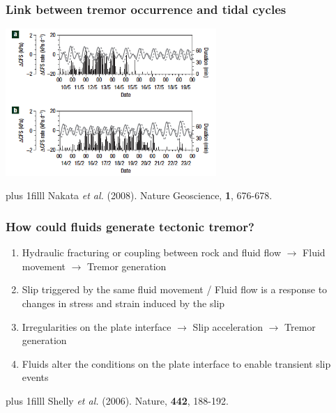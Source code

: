 \documentclass{beamer}
\newcommand{\btVFill}{\vskip0pt plus 1filll}
\begin{document}
	\begin{frame}
		\frametitle{Link between tremor occurrence and tidal cycles}
		\begin{center}
			\includegraphics[trim={0cm 0cm 0cm 0cm}, clip, width=8cm]{articles/nakata_al_2008_2.png}
		\end{center}
		\btVFill
		\tiny{Nakata \textit{et al.} (2008). Nature Geoscience, \textbf{1}, 676-678.}
	\end{frame}

	\begin{frame}
		\frametitle{How could fluids generate tectonic tremor?}
		\vspace{1em}

		\begin{enumerate}
			\item Hydraulic fracturing or coupling between rock and fluid flow $\rightarrow$ Fluid movement $\rightarrow$ Tremor generation
			\item[] Slip triggered by the same fluid movement / Fluid flow is a response to changes in stress and strain induced by the slip

			\vspace{2em}

			\item Irregularities on the plate interface $\rightarrow$ Slip acceleration $\rightarrow$ Tremor generation
			\item[] Fluids alter the conditions on the plate interface to enable transient slip events
		\end{enumerate}
		\btVFill
		\tiny{Shelly \textit{et al.} (2006). Nature, \textbf{442}, 188-192.}
	\end{frame}
\end{document}
